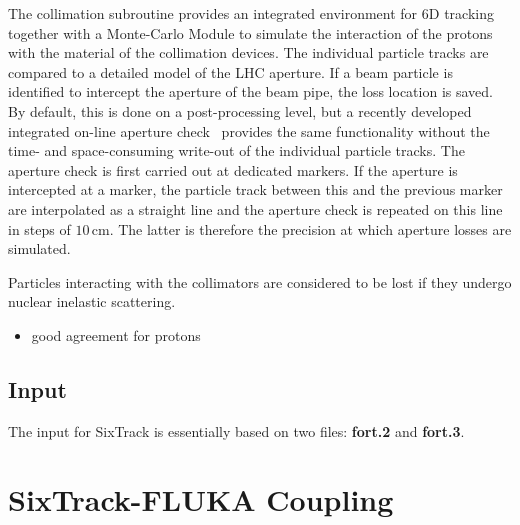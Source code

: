 The collimation subroutine provides an integrated environment for 6D tracking together with a Monte-Carlo Module to simulate the interaction of the protons with the material of the collimation devices. The individual particle tracks are compared to a detailed model of the LHC aperture. If a beam particle is identified to intercept the aperture of the beam pipe, the loss location is saved. By default, this is done on a post-processing level, but a recently developed integrated on-line aperture check~\cite{} provides the same functionality without the time- and space-consuming write-out of the individual particle tracks. The aperture check is first carried out at dedicated markers. If the aperture is intercepted at a marker, the particle track between this and the previous marker are interpolated as a straight line and the aperture check is repeated on this line in steps of $10\,$cm. The latter is therefore the precision at which aperture losses are simulated. 

Particles interacting with the collimators are considered to be lost if they undergo nuclear inelastic scattering. 

\begin{itemize}
\item good agreement for protons

\end{itemize}





\subsection{Input}

The input for SixTrack is essentially based on two files: \textbf{fort.2} and \textbf{fort.3}.



\section{SixTrack-FLUKA Coupling}
